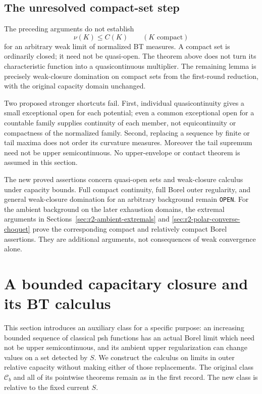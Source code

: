 \documentclass[11pt,a4paper]{article}
\numberwithin{equation}{section}
\theoremstyle{definition}
\theoremstyle{remark}
\newcommand{\Cb}{\mathcal C_b}
\begin{document}
\subsection{The unresolved compact-set step}

The preceding arguments do not establish
\[
 \nu(K)\leq C(K)
 \qquad(K\text{ compact})
\]
for an arbitrary weak limit of normalized BT measures. A compact
set is ordinarily closed; it need not be quasi-open. The theorem
above does not turn its characteristic function into a
quasicontinuous multiplier. The remaining lemma is precisely
weak-closure domination on compact sets from the first-round
reduction, with the original capacity domain unchanged.

Two proposed stronger shortcuts fail. First, individual
quasicontinuity gives a small exceptional open for each potential;
even a common exceptional open for a countable family supplies
continuity of each member, not equicontinuity or compactness of the
normalized family. Second, replacing a sequence by finite or tail
maxima does not order its curvature measures. Moreover the tail
supremum need not be upper semicontinuous. No upper-envelope or
contact theorem is assumed in this section.

The new proved assertions concern quasi-open sets and weak-closure
calculus under capacity bounds. Full compact continuity, full
Borel outer regularity, and general weak-closure domination for an
arbitrary background remain \texttt{OPEN}. For the ambient background
on the later exhaustion domains, the extremal arguments in
Sections~\ref{sec:r2-ambient-extremals} and
\ref{sec:r2-polar-converse-choquet} prove the corresponding compact
and relatively compact Borel assertions. They are additional
arguments, not consequences of weak convergence alone.



\section{A bounded capacitary closure and its BT calculus}
\label{sec:r2-capacitary-closure}

This section introduces an auxiliary class for a specific purpose:
an increasing bounded sequence of classical psh functions has an
actual Borel limit which need not be upper semicontinuous, and its
ambient upper regularization can change values on a set detected by
$S$. We construct the calculus on limits in outer relative capacity
without making either of those replacements. The original class
$\Cb$ and all of its pointwise theorems remain as in the first record.
The new class is relative to the fixed current $S$.
\end{document}
